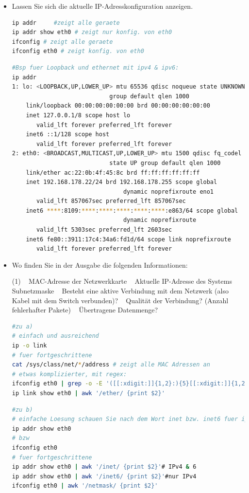 \documentclass[paper=a4,fontsize=11pt]{scrartcl}%
\numberwithin{equation}{section}
\begin{document}
\begin{itemize}
	\item[1.)] Lassen Sie sich die aktuelle IP-Adresskonfiguration anzeigen.
	\begin{lstlisting}[style=Bash, language=Bash]
ip addr 	#zeigt alle geraete
ip addr show eth0 # zeigt nur konfig. von eth0
ifconfig # zeigt alle geraete
ifconfig eth0 # zeigt konfig. von eth0
		\end{lstlisting}
		
		\begin{lstlisting}[style=Bash, language=Bash]
#Bsp fuer Loopback und ethernet mit ipv4 & ipv6:
ip addr 	
1: lo: <LOOPBACK,UP,LOWER_UP> mtu 65536 qdisc noqueue state UNKNOWN 
							group default qlen 1000
    link/loopback 00:00:00:00:00:00 brd 00:00:00:00:00:00
    inet 127.0.0.1/8 scope host lo
       valid_lft forever preferred_lft forever
    inet6 ::1/128 scope host 
       valid_lft forever preferred_lft forever
2: eth0: <BROADCAST,MULTICAST,UP,LOWER_UP> mtu 1500 qdisc fq_codel
							state UP group default qlen 1000
    link/ether ac:22:0b:4f:45:8c brd ff:ff:ff:ff:ff:ff
    inet 192.168.178.22/24 brd 192.168.178.255 scope global
    							dynamic noprefixroute eno1
       valid_lft 857067sec preferred_lft 857067sec
    inet6 ****:8109:****:****:****:****:****:e863/64 scope global
    							dynamic noprefixroute 
       valid_lft 5303sec preferred_lft 2603sec
    inet6 fe80::3911:17c4:34a6:fd1d/64 scope link noprefixroute 
       valid_lft forever preferred_lft forever
		\end{lstlisting}
	\item[2.)] Wo finden Sie in der Ausgabe die folgenden Informationen:
	\begin{tasks}(1)
		\task~ MAC-Adresse der Netzwerkkarte
		\task~ Aktuelle IP-Adresse des Systems
		\task~ Subnetzmaske
		\task~ Besteht eine aktive Verbindung mit dem Netzwerk (also Kabel mit dem Switch verbunden)?
		\task~ Qualität der Verbindung? (Anzahl fehlerhafter Pakete)
		\task~ Übertragene Datenmenge?
	\end{tasks}
	\begin{lstlisting}[style=Bash, language=Bash]
#zu a)
# einfach und ausreichend
ip -o link
# fuer fortgeschrittene
cat /sys/class/net/*/address # zeigt alle MAC Adressen an
# etwas komplizierter, mit regex:
ifconfig eth0 | grep -o -E '([[:xdigit:]]{1,2}:){5}[[:xdigit:]]{1,2}'
ip link show eth0 | awk '/ether/ {print $2}'
	\end{lstlisting}
		
\begin{lstlisting}[style=Bash, language=Bash]
#zu b)
# einfache Loesung schauen Sie nach dem Wort inet bzw. inet6 fuer ipv6
ip addr show eth0 
# bzw
ifconfig eth0
# fuer fortgeschrittene
ip addr show eth0 | awk '/inet/ {print $2}'# IPv4 & 6
ip addr show eth0 | awk '/inet6/ {print $2}'#nur IPv4
ifconfig eth0 | awk '/netmask/ {print $2}'
	\end{lstlisting}	
		

\end{itemize}
\end{document}
